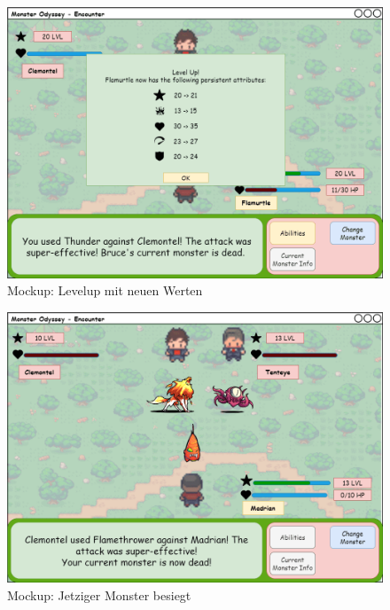 \begin{figure}[H]
    \center
    \includegraphics[scale=\scale]{images/mockups/Encounter/Encounter1v1AbilitiesUsedWonLevelUpNoAbility.png}
    \caption{Mockup: Levelup mit neuen Werten}
    \label{fig: Levelup mit neuen Werten}
\end{figure}
\begin{figure}[H]
    \center
    \includegraphics[scale=\scale]{images/mockups/Encounter/Encounter1v2OpponentAttackedAndLost.png}
    \caption{Mockup: Jetziger Monster besiegt}
    \label{fig: Jetziger Monster besiegt}
\end{figure}

